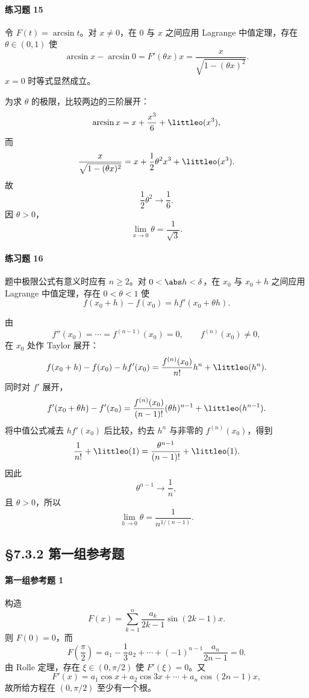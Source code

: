\paragraph{练习题 15}
\begin{xsolution}
令 $F(t)=\arcsin t$。对 $x\neq0$，在 $0$ 与 $x$ 之间应用 Lagrange 中值定理，存在 $\theta\in(0,1)$ 使
\[
  \arcsin x-\arcsin0
  =F'(\theta x)x
  =\frac{x}{\sqrt{1-(\theta x)^2}}.
\]
$x=0$ 时等式显然成立。

为求 $\theta$ 的极限，比较两边的三阶展开：
\[
  \arcsin x=x+\frac{x^3}{6}+\littleo(x^3),
\]
而
\[
  \frac{x}{\sqrt{1-(\theta x)^2}}
  =x+\frac12\theta^2x^3+\littleo(x^3).
\]
故
\[
  \frac12\theta^2\to\frac16.
\]
因 $\theta>0$，
\[
  \lim_{x\to0}\theta=\frac1{\sqrt3}.
\]
\end{xsolution}

\paragraph{练习题 16}
\begin{xsolution}
题中极限公式有意义时应有 $n\geqslant2$。对 $0<\abs h<\delta$，在 $x_0$ 与 $x_0+h$ 之间应用 Lagrange 中值定理，存在 $0<\theta<1$ 使
\[
  f(x_0+h)-f(x_0)=hf'(x_0+\theta h).
\]

由
\[
  f''(x_0)=\cdots=f^{(n-1)}(x_0)=0,
  \qquad f^{(n)}(x_0)\neq0,
\]
在 $x_0$ 处作 Taylor 展开：
\[
  f(x_0+h)-f(x_0)-hf'(x_0)
  =\frac{f^{(n)}(x_0)}{n!}h^n+\littleo(h^n).
\]
同时对 $f'$ 展开，
\[
  f'(x_0+\theta h)-f'(x_0)
  =\frac{f^{(n)}(x_0)}{(n-1)!}(\theta h)^{n-1}
   +\littleo(h^{n-1}).
\]
将中值公式减去 $hf'(x_0)$ 后比较，约去 $h^n$ 与非零的 $f^{(n)}(x_0)$，得到
\[
  \frac1{n!}+\littleo(1)
  =\frac{\theta^{n-1}}{(n-1)!}+\littleo(1).
\]
因此
\[
  \theta^{n-1}\to\frac1n,
\]
且 $\theta>0$，所以
\[
  \boxed{\displaystyle
  \lim_{h\to0}\theta=\frac1{n^{1/(n-1)}}}.
\]
\end{xsolution}

\subsection*{§7.3.2 第一组参考题}

\paragraph{第一组参考题 1}
\begin{xsolution}
构造
\[
  F(x)=\sum_{k=1}^n\frac{a_k}{2k-1}\sin(2k-1)x.
\]
则 $F(0)=0$，而
\[
  F\left(\frac\pi2\right)
  =a_1-\frac13a_2+\cdots+(-1)^{n-1}\frac{a_n}{2n-1}=0.
\]
由 Rolle 定理，存在 $\xi\in(0,\pi/2)$ 使 $F'(\xi)=0$。又
\[
  F'(x)=a_1\cos x+a_2\cos3x+\cdots+a_n\cos(2n-1)x,
\]
故所给方程在 $(0,\pi/2)$ 至少有一个根。
\end{xsolution}

